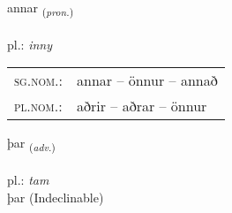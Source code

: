 \documentclass[frontgrid, backgrid]{flacards}\usepackage[]{graphicx}\usepackage[]{xcolor}
\begin{document}
\renewcommand{\blhead}{\vskip5pt {\small\bfseries\footnotesize Fornafn | zaimek }}
\renewcommand{\bcfoot}{\vskip5pt \hspace{2pt}{\small\bfseries\footnotesize 1K}}


{annar \small{\textsubscript{(\textit{pron.})}} \\[1ex] %
\textphonetic{[anar]} \\
pl.: \emph{inny} \\  [2ex]
\renewcommand*{\arraystretch}{0.8}
\begin{tabular}{ll}
\textsc{sg.nom.}: & annar  --  önnur -- annað \\ 
\textsc{pl.nom.}: & aðrir -- aðrar -- önnur
\end{tabular}
}


\renewcommand{\flhead}{\vskip5pt \fboxsep=0pt {\small\bfseries\footnotesize Atviksorð | przysłówek}}
\renewcommand{\fcfoot}{\vskip5pt \fboxsep=0pt \hspace{2pt}{\small\bfseries\footnotesize 1K}}

\renewcommand{\blhead}{\vskip5pt {\small\bfseries\footnotesize Atviksorð | przysłówek }}
\renewcommand{\bcfoot}{\vskip5pt \hspace{2pt}{\small\bfseries\footnotesize 1K}}


{þar \small{\textsubscript{(\textit{adv.})}} \\[1ex]
\textphonetic{[θaːr]} \\
pl.: \emph{tam} \\  [2ex]
þar (Indeclinable)}


\renewcommand{\flhead}{\vskip5pt \fboxsep=0pt {\small\bfseries\footnotesize Forsetning | przyimek}}
\renewcommand{\fcfoot}{\vskip5pt \fboxsep=0pt \hspace{2pt}{\small\bfseries\footnotesize 1K}}

\renewcommand{\blhead}{\vskip5pt {\small\bfseries\footnotesize Forsetning | przyimek }}
\renewcommand{\bcfoot}{\vskip5pt \hspace{2pt}{\small\bfseries\footnotesize 1K}}
\end{document}
